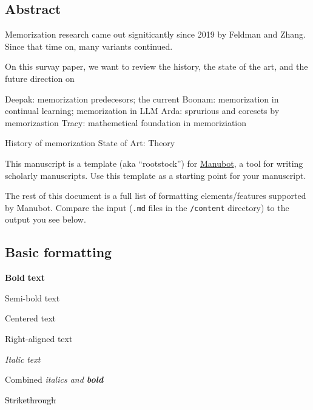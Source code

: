 \hypertarget{abstract}{%
\subsection{Abstract}\label{abstract}}

Memorization research came out signiticantly since 2019 by Feldman and Zhang.
Since that time on, many variants continued.

On this survay paper, we want to review the history, the state of the art, and the future direction on

Deepak: memorization predecesors; the current
Boonam: memorization in continual learning; memorization in LLM
Arda: sprurious and coresets by memorizastion
Tracy: mathemetical foundation in memoriziation

History of memorization
State of Art:
Theory

This manuscript is a template (aka ``rootstock'') for \href{https://manubot.org/}{Manubot}, a tool for writing scholarly manuscripts.
Use this template as a starting point for your manuscript.

The rest of this document is a full list of formatting elements/features supported by Manubot.
Compare the input (\texttt{.md} files in the \texttt{/content} directory) to the output you see below.

\hypertarget{basic-formatting}{%
\subsection{Basic formatting}\label{basic-formatting}}

\textbf{Bold} \textbf{text}

{Semi-bold text}

{Centered text}

{Right-aligned text}

\emph{Italic} \emph{text}

Combined \emph{italics and \textbf{bold}}

\sout{Strikethrough}

